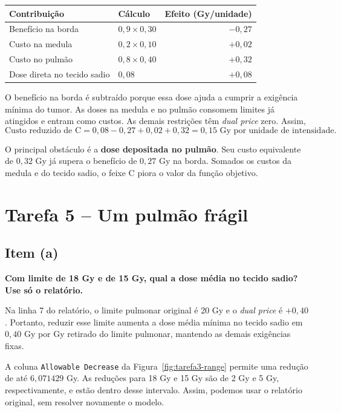 \documentclass[12pt,a4paper]{article}
\begin{document}
\begin{center}
\begin{tabular}{llr}
\toprule
\textbf{Contribuição} & \textbf{Cálculo} & \textbf{Efeito (Gy/unidade)} \\
\midrule
Benefício na borda & $0{,}9\times0{,}30$ & $-0{,}27$ \\
Custo na medula & $0{,}2\times0{,}10$ & $+0{,}02$ \\
Custo no pulmão & $0{,}8\times0{,}40$ & $+0{,}32$ \\
Dose direta no tecido sadio & $0{,}08$ & $+0{,}08$ \\
\bottomrule
\end{tabular}
\end{center}

O benefício na borda é subtraído porque essa dose ajuda a cumprir a
exigência mínima do tumor. As doses na medula e no pulmão consomem
limites já atingidos e entram como custos. As demais restrições têm
\textit{dual price} zero. Assim,
\[
\text{Custo reduzido de C}
=0{,}08-0{,}27+0{,}02+0{,}32
=\boxed{0{,}15\text{ Gy por unidade de intensidade}}.
\]

O principal obstáculo é a \textbf{dose depositada no pulmão}.
Seu custo equivalente de $0{,}32$ Gy já supera o benefício de
$0{,}27$ Gy na borda. Somados os custos da medula e do tecido sadio,
o feixe C piora o valor da função objetivo.

\clearpage
\section*{Tarefa 5 -- Um pulmão frágil}

\subsection*{Item (a)}

\textbf{Com limite de 18 Gy e de 15 Gy, qual a dose média no tecido
sadio? Use só o relatório.}

Na linha 7 do relatório, o limite pulmonar original é 20 Gy e o
\textit{dual price} é $+0{,}40$. Portanto, reduzir esse limite aumenta
a dose média mínima no tecido sadio em $0{,}40$ Gy por Gy retirado
do limite pulmonar, mantendo as demais exigências fixas.

A coluna \texttt{Allowable Decrease} da
Figura~\ref{fig:tarefa3-range} permite uma redução de até
$6{,}071429$ Gy. As reduções para 18 Gy e 15 Gy são de 2 Gy e
5 Gy, respectivamente, e estão dentro desse intervalo. Assim,
podemos usar o relatório original, sem resolver novamente o modelo.
\end{document}
